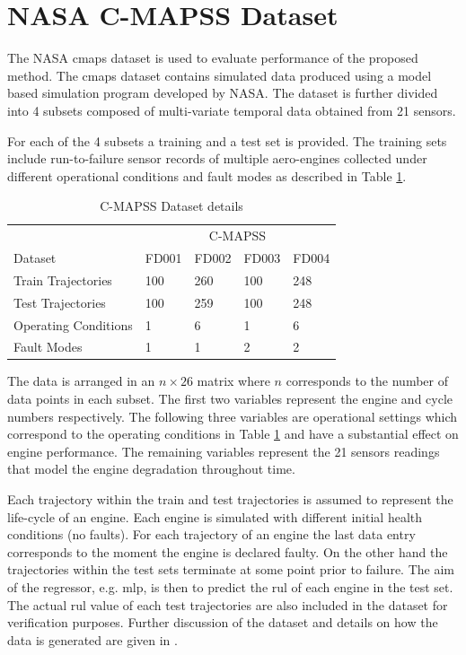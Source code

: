 \documentclass{article}
\begin{document}

\section{NASA C-MAPSS Dataset}
\label{sec:rul_dataset}

The NASA \gls{cmaps} dataset \cite{CMAPS2008} is used to evaluate performance of the proposed method. The \gls{cmaps} dataset contains simulated data produced using a model based simulation program developed by NASA. The dataset is further divided into 4 subsets composed of multi-variate temporal data obtained from 21 sensors.

For each of the 4 subsets a training and a test set is provided. The training sets include run-to-failure sensor records of multiple aero-engines collected under different operational conditions and fault modes as described in Table \ref{table:cmapss}.

\begin{table}[!htb]
\centering
\begin{tabular}{l | l l l l}
	\hline
	 & \multicolumn{4}{c}{C-MAPSS}\\  
	 Dataset & FD001 & FD002 & FD003 & FD004\\
  	\hline
  	Train Trajectories & 100 & 260 & 100 & 248\\
  	Test Trajectories & 100 & 259 & 100 & 248\\
  	Operating Conditions & 1 & 6 & 1 & 6\\
  	Fault Modes & 1 & 1 & 2 & 2\\
  	\hline
\end{tabular}
\caption{C-MAPSS Dataset details}
\label{table:cmapss}
\end{table}

The data is arranged in an $n\times26$ matrix where $n$ corresponds to the number of data points in each subset. The first two variables represent the engine and cycle numbers respectively. The following three variables are operational settings which correspond to the operating conditions in Table \ref{table:cmapss} and have a substantial effect on engine performance. The remaining variables represent the 21 sensors readings that model the engine degradation throughout time.

Each trajectory within the train and test trajectories is assumed to represent the life-cycle of an engine. Each engine is simulated with different initial health conditions (no faults). For each trajectory of an engine the last data entry corresponds to the moment the engine is declared faulty. On the other hand the trajectories within the test sets terminate at some point prior to failure. The aim of the regressor, e.g. \gls{mlp}, is then to predict the \gls{rul} of each engine in the test set. The actual \gls{rul} value of each test trajectories are also included in the dataset for verification purposes. Further discussion of the dataset and details on how the data is generated are given in \cite{Saxena2008}.
\end{document}
